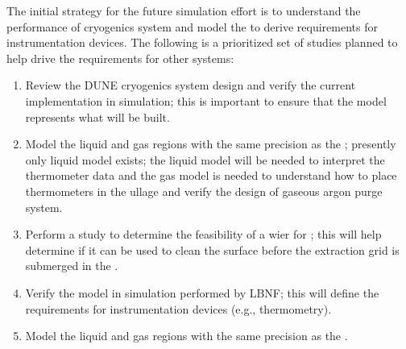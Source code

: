The initial strategy for the future  simulation effort is to understand the performance of  cryogenics system and model the  to derive requirements for instrumentation devices.
The following is a prioritized set of studies planned to help drive the requirements for other systems:
\begin{enumerate}
\item Review the DUNE  cryogenics system design and verify the current implementation in simulation; this is important to ensure that the model represents what will be built.
\item Model the   liquid and gas regions with the same precision as the ; presently only liquid model exists; the liquid model will be needed to interpret the thermometer data and the gas model is needed to understand how to place thermometers in the ullage and verify the design of gaseous argon purge system.
\item Perform a  study to determine the feasibility of a wier for \dual; this will help determine if it can be used to clean the \lar surface before the extraction grid is submerged in the .
\item Verify the  \single {} model in simulation performed by LBNF; this will define the requirements for instrumentation devices (e.g., thermometry).
\item Model the  liquid and gas regions with the same precision as the . 
\end{enumerate}